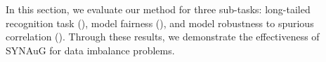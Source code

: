 
In this section, 
we evaluate our method for three sub-tasks: long-tailed recognition task (), model fairness (), and model robustness to spurious correlation ().
Through these results, we demonstrate the effectiveness of SYNAuG for data imbalance problems.